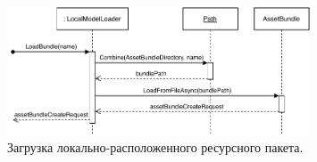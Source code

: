 \begin{figure}[!htp]
    \centering
    \includegraphics[width=0.8\textwidth]{images/UML-SLocalLoadBundle.pdf}
    \caption{Загрузка локально-расположенного ресурсного пакета.}
    \label{figure:SLocalLoadBundle}
\end{figure}
